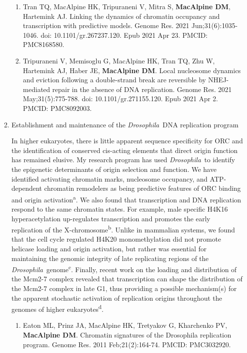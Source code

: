 \documentclass{nihbiosketch}
\newcommand\dros{{\itshape Drosophila}\xspace}
\begin{document}
\begin{enumerate}
\begin{enumerate}
\item Tran TQ, MacAlpine HK, Tripuraneni V, Mitra S, \textbf{MacAlpine DM}, Hartemink AJ. Linking the dynamics of chromatin occupancy and transcription with predictive models. Genome Res. 2021 Jun;31(6):1035-1046. doi: 10.1101/gr.267237.120. Epub 2021 Apr 23. PMCID: PMC8168580.

\item Tripuraneni V, Memisoglu G, MacAlpine HK, Tran TQ, Zhu W, Hartemink AJ, Haber JE, \textbf{MacAlpine DM}. Local nucleosome dynamics and eviction following a double-strand break are reversible by NHEJ-mediated repair in the absence of DNA replication. Genome Res. 2021 May;31(5):775-788. doi: 10.1101/gr.271155.120. Epub 2021 Apr 2. PMCID: PMC8092003.

\end{enumerate}


\item Establishment and maintenance of the \dros\ DNA replication program

In higher eukaryotes, there is little apparent sequence specificity for ORC and the identification of conserved cis-acting elements that direct origin function has remained elusive.  My research program has used \dros\ to identify the epigenetic determinants of origin selection and function. We have identified activating chromatin marks, nucleosome occupancy, and ATP-dependent chromatin remodelers as being predictive features of ORC binding and origin activation\textsuperscript{a}. We also found that transcription and DNA replication respond to the same chromatin states.  For example, male specific H4K16 hyperacetylation up-regulates transcription and promotes the early replication of the X-chromosome\textsuperscript{b}.  Unlike in mammalian systems, we found that the cell cycle regulated H4K20 monomethylation did not promote helicase loading and origin activation, but rather was essential for maintaining the genomic integrity of late replicating regions of the \dros\ genome\textsuperscript{c}.  Finally, recent work on the loading and distribution of the Mcm2-7 complex revealed that transcription can shape the distribution of the Mcm2-7 complex in late G1, thus providing a possible mechanism(s) for the apparent stochastic activation of replication origins throughout the genomes of higher eukaryotes\textsuperscript{d}.


\begin{enumerate}
\setlength\itemsep{0.35em}

\item Eaton ML, Prinz JA, MacAlpine HK, Tretyakov G, Kharchenko PV, \textbf{MacAlpine DM}. Chromatin signatures of the Drosophila replication program. Genome Res. 2011 Feb;21(2):164-74. PMCID: PMC3032920.


\end{enumerate}
\end{enumerate}
\end{document}

